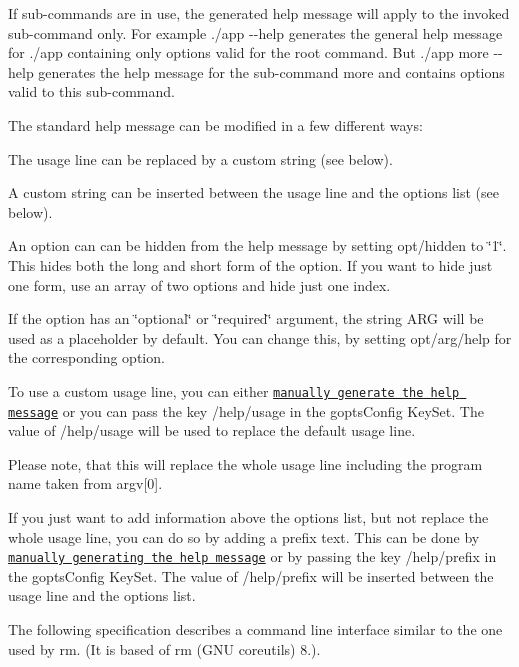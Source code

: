 If sub-\/commands are in use, the generated help message will apply to the invoked sub-\/command only. For example {\ttfamily ./app -\/-\/help} generates the general help message for {\ttfamily ./app} containing only options valid for the root command. But {\ttfamily ./app more -\/-\/help} generates the help message for the sub-\/command {\ttfamily more} and contains options valid to this sub-\/command.

The standard help message can be modified in a few different ways\+:


\begin{DoxyItemize}
\item The usage line can be replaced by a custom string (see below).
\item A custom string can be inserted between the usage line and the options list (see below).
\item An option can can be hidden from the help message by setting {\ttfamily opt/hidden} to {\ttfamily \char`\"{}1\char`\"{}}. This hides both the long and short form of the option. If you want to hide just one form, use an array of two options and hide just one index.
\item If the option has an {\ttfamily \char`\"{}optional\char`\"{}} or {\ttfamily \char`\"{}required\char`\"{}} argument, the string {\ttfamily A\+RG} will be used as a placeholder by default. You can change this, by setting {\ttfamily opt/arg/help} for the corresponding option.
\end{DoxyItemize}

To use a custom usage line, you can either \href{#manual-help-message}{\tt manually generate the help message} or you can pass the key {\ttfamily /help/usage} in the {\ttfamily gopts\+Config} Key\+Set. The value of {\ttfamily /help/usage} will be used to replace the default usage line.

Please note, that this will replace the whole usage line including the program name taken from {\ttfamily argv\mbox{[}0\mbox{]}}.

If you just want to add information above the options list, but not replace the whole usage line, you can do so by adding a prefix text. This can be done by \href{#manual-help-message}{\tt manually generating the help message} or by passing the key {\ttfamily /help/prefix} in the {\ttfamily gopts\+Config} Key\+Set. The value of {\ttfamily /help/prefix} will be inserted between the usage line and the options list.

The following specification describes a command line interface similar to the one used by {\ttfamily rm}. (It is based of {\ttfamily rm (G\+NU coreutils) 8.}).


